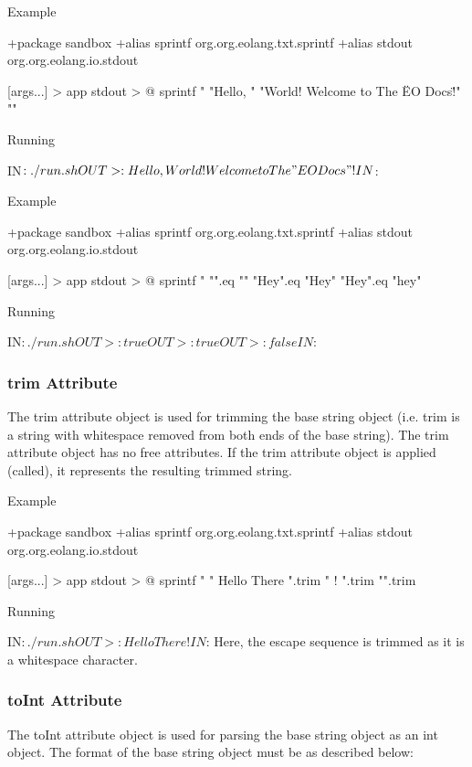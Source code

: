 \documentclass[12pt]{book}
\begin{document}
Example
\begin{ffcode}
+package sandbox
+alias sprintf org.org.eolang.txt.sprintf
+alias stdout org.org.eolang.io.stdout

[args...] > app
  stdout > @
    sprintf
      "%
      "Hello, "
      "World! Welcome to The \"EO Docs\"!"
      "\n"

Running

IN$: ./run.sh
OUT>: Hello, World! Welcome to The "EO Docs"!
IN$: 
\end{ffcode}

Example
\begin{ffcode}
+package sandbox
+alias sprintf org.org.eolang.txt.sprintf
+alias stdout org.org.eolang.io.stdout

[args...] > app
  stdout > @
    sprintf
      "%
      "".eq ""
      "Hey".eq "Hey"
      "Hey".eq "hey"

Running

IN$: ./run.sh
OUT>: true
OUT>: true
OUT>: false
IN$: 
\end{ffcode}

\subsubsection{trim Attribute}
The trim attribute object is used for trimming the base string object (i.e. trim is a string with whitespace removed from both ends of the base string).
The trim attribute object has no free attributes.
If the trim attribute object is applied (called), it represents the resulting trimmed string.

Example

\begin{ffcode}
+package sandbox
+alias sprintf org.org.eolang.txt.sprintf
+alias stdout org.org.eolang.io.stdout

[args...] > app
  stdout > @
    sprintf
      "%
      "  Hello There  ".trim
      "            !           ".trim
      "\n".trim

Running

IN$: ./run.sh
OUT>: Hello There!IN$: 
Here, the \n escape sequence is trimmed as it is a
whitespace character.
\end{ffcode}

\subsubsection{toInt Attribute}
The toInt attribute object is used for parsing the base string object as an int object.
The format of the base string object must be as described below:
\end{document}
